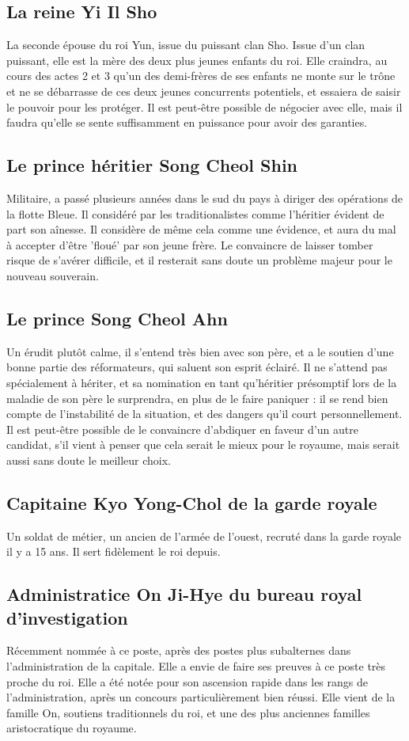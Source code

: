 \documentclass[10pt,a4paper]{book}
\begin{document}
\subsection{La reine Yi Il Sho}
La seconde épouse du roi Yun, issue du puissant clan Sho. Issue d'un clan puissant, elle est la mère des deux plus jeunes enfants du roi. Elle craindra, au cours des actes 2 et 3 qu'un des demi-frères de ses enfants ne monte sur le trône et ne se débarrasse de ces deux jeunes concurrents potentiels, et essaiera de saisir le pouvoir pour les protéger. Il est peut-être possible de négocier avec elle, mais il faudra qu'elle se sente suffisamment en puissance pour avoir des garanties.
\subsection{Le prince héritier Song Cheol Shin}
Militaire, a passé plusieurs années dans le sud du pays à diriger des opérations de la flotte Bleue. Il considéré par les traditionalistes comme l'héritier évident de part son aînesse. Il considère de même cela comme une évidence, et aura du mal à accepter d'être 'floué' par son jeune frère. Le convaincre de laisser tomber risque de s'avérer difficile, et il resterait sans doute un problème majeur pour le nouveau souverain. 
\subsection{Le prince Song Cheol Ahn}
Un érudit plutôt calme, il s'entend très bien avec son père, et a le soutien d'une bonne partie des réformateurs, qui saluent son esprit éclairé. Il ne s'attend pas spécialement à hériter, et sa nomination en tant qu'héritier présomptif lors de la maladie de son père le surprendra, en plus de le faire paniquer : il se rend bien compte de l'instabilité de la situation, et des dangers qu'il court personnellement. Il est peut-être possible de le convaincre d'abdiquer en faveur d'un autre candidat, s'il vient à penser que cela serait le mieux pour le royaume, mais serait aussi sans doute le meilleur choix.
\subsection{Capitaine Kyo Yong-Chol de la garde royale}
Un soldat de métier, un ancien de l'armée de l'ouest, recruté dans la garde royale il y a 15 ans. Il sert fidèlement le roi depuis.
\subsection{Administratice On Ji-Hye du bureau royal d'investigation}
Récemment nommée à ce poste, après des postes plus subalternes dans l'administration de la capitale. Elle a envie de faire ses preuves à ce poste très proche du roi. Elle a été notée pour son ascension rapide dans les rangs de l'administration, après un concours particulièrement bien réussi. Elle vient de la famille On, soutiens traditionnels du roi, et une des plus anciennes familles aristocratique du royaume.
\end{document}
